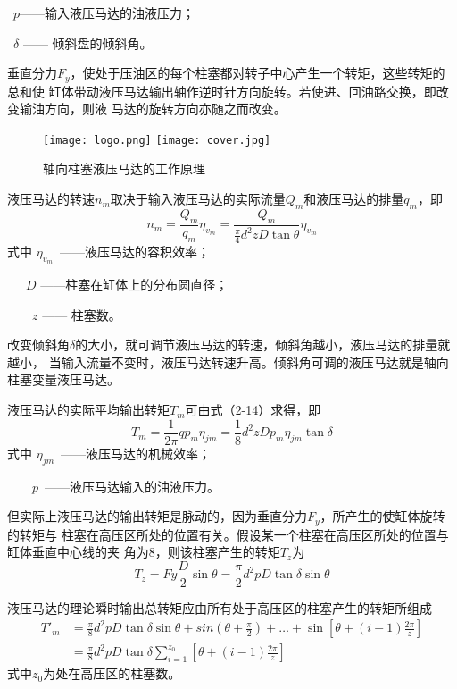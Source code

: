 \qquad \ $p$——输入液压马达的油液压力；

\qquad\ $\delta$ —— 倾斜盘的倾斜角。

垂直分力$F_{y}$，使处于压油区的每个柱塞都对转子中心产生一个转矩，这些转矩的总和使
缸体带动液压马达输出轴作逆时针方向旋转。若使进、回油路交换，即改变输油方向，则液
马达的旋转方向亦随之而改变。

\begin{figure}[!htb]\centering
    \ifOpenSource
    \texttt{[image: logo.png]}
    \else
    \texttt{[image: cover.jpg]}
    \fi
    \caption{轴向柱塞液压马达的工作原理}
    \label{fig0220}
\end{figure}

液压马达的转速$n_{m}$取决于输入液压马达的实际流量$Q_{m}$和液压马达的排量$q_{m}$，即
\begin{equation}
    n_{m}=\frac{Q_{m}}{q_{m}}\eta _{v_{m}}=\frac{Q_{m}}{\frac{\pi }{4}d^2zD\tan \theta } \eta _{v_{m}}  
\end{equation}
式中 \qquad  $\eta _{v_{m}}  $\ ——液压马达的容积效率；

\qquad \ \ \ $D$ ——柱塞在缸体上的分布圆直径；

\qquad \ \ \ \ $z$ —— 柱塞数。

改变倾斜角$\delta $的大小，就可调节液压马达的转速，倾斜角越小，液压马达的排量就越小，
当输入流量不变时，液压马达转速升高。倾斜角可调的液压马达就是轴向柱塞变量液压马达。

液压马达的实际平均输出转矩$T_{m}$可由式（2-14）求得，即
\begin{equation}
       T_{m}= \frac{1}{2\pi}q p_{m}\eta _{jm}=
     \frac{1}{8}d^2zDp_{m}\eta _{jm}\tan\delta  
\end{equation}
式中  \qquad $\eta _{jm}$\ ——液压马达的机械效率；

\qquad \ \  \ \  $p$\ ——液压马达输入的油液压力。

但实际上液压马达的输出转矩是脉动的，因为垂直分力$F_{y}$，所产生的使缸体旋转的转矩与
柱塞在高压区所处的位置有关。假设某一个柱塞在高压区所处的位置与缸体垂直中心线的夹
角为8，则该柱塞产生的转矩$T_{z}$为
$$T_{z}=Fy\frac{D}{2}\sin\theta =\frac{\pi }{2} d^2pD\tan \delta \sin \theta  $$

液压马达的理论瞬时输出总转矩应由所有处于高压区的柱塞产生的转矩所组成
\begin{equation}\label{2.32}
    \begin{split}
        T'_{m}&=\frac{\pi}{8}d^2pD\tan\delta {\sin\theta +
        sin(\theta +\frac{\pi}{2})+\dots+\sin[\theta +(i-1)\frac{2\pi}{z}]}\\
        &=\frac{\pi}{8}d^2pD\tan\delta \sum_{i = 1}^{z_{0}}  [ \theta +( i-1)\frac{2\pi}{z}]
    \end{split}
\end{equation}
式中$z_{0}$为处在高压区的柱塞数。

